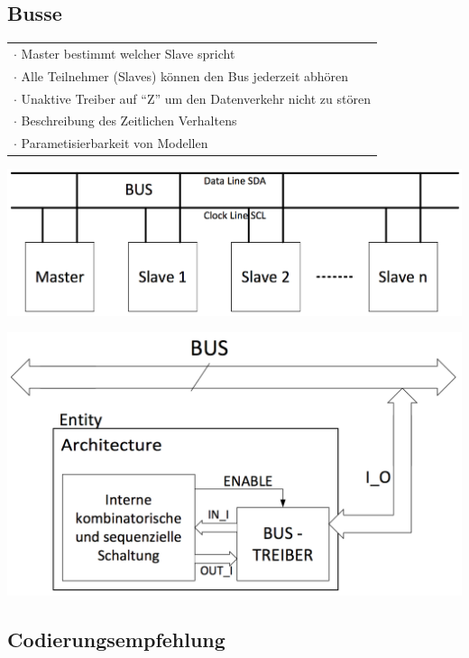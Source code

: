 \begin{minipage}{0.5\textwidth}
	\subsection{Busse}
	\begin{tabular}{l}
		$\cdot$ Master bestimmt welcher Slave spricht \\
		$\cdot$ Alle Teilnehmer (Slaves) können den Bus jederzeit abhören \\
		$\cdot$ Unaktive Treiber auf "`Z"' um den Datenverkehr nicht zu stören \\
		$\cdot$ Beschreibung des Zeitlichen Verhaltens  \\
		$\cdot$ Parametisierbarkeit von Modellen \\
	\end{tabular}
	\begin{minipage}{0.5\textwidth}
		\includegraphics[width=\textwidth]{./bilder/Bus1}
	\end{minipage}
	\begin{minipage}{0.4\textwidth}
		\includegraphics[width=\textwidth]{./bilder/Bus2}
	\end{minipage}
	\subsection{Codierungsempfehlung}
\end{minipage}
